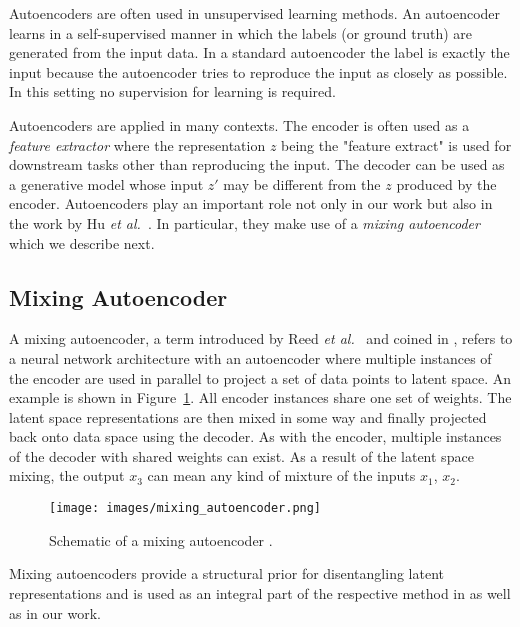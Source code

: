 \documentclass[a4paper,12pt]{report}
\begin{document}
Autoencoders are often used in unsupervised learning methods. An autoencoder learns in a self-supervised manner in which the labels (or ground truth) are generated from the input data. In a standard autoencoder the label is exactly the input because the autoencoder tries to reproduce the input as closely as possible. In this setting no supervision for learning is required.

Autoencoders are applied in many contexts. The encoder is often used as a \textit{feature extractor} where the representation $z$ being the "feature extract" is used for downstream tasks other than reproducing the input. The decoder can be used as a generative model whose input $z'$ may be different from the $z$ produced by the encoder. Autoencoders play an important role not only in our work but also in the work by Hu \textit{et al.}~\cite{DisentFacOfVarByMixTh}. In particular, they make use of a \textit{mixing autoencoder} which we describe next.


\subsection{Mixing Autoencoder}\label{subsec:mixAE}
A mixing autoencoder, a term introduced by Reed \textit{et al.}~\cite{DeepVisAnaMak} and coined in \cite{DisentFacOfVarByMixTh}, refers to a neural network architecture with an autoencoder where multiple instances of the encoder are used in parallel to project a set of data points to latent space. An example is shown in Figure~\ref{fig:mixing_autoencoder}. All encoder instances share one set of weights. The latent space representations are then mixed in some way and finally projected back onto data space using the decoder. As with the encoder, multiple instances of the decoder with shared weights can exist. As a result of the latent space mixing, the output $x_3$ can mean any kind of mixture of the inputs $x_1$, $x_2$.
\begin{figure}[ht]
\centering
\texttt{[image: images/mixing\_autoencoder.png]}
\caption{Schematic of a mixing autoencoder \cite{DisentFacOfVarByMixTh}.}
\label{fig:mixing_autoencoder}
\end{figure}

Mixing autoencoders provide a structural prior for disentangling latent representations and is used as an integral part of the respective method in \cite{DisentFacOfVarByMixTh, DeepVisAnaMak} as well as in our work.


\end{document}
